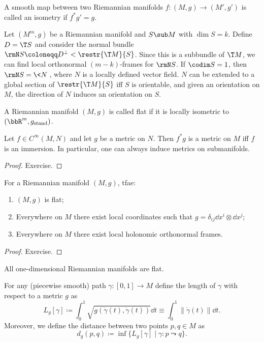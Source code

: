 \begin{defn}[Isometry]
A smooth map between two Riemannian manifolds $f:(M,g)\to(M',g')$ is called an isometry if $f^\ast g'=g$.
\end{defn}

\begin{cor}
Let $(M^m,g)$ be a Riemannian manifold and $S\sub M$ with $\dim S=k$. Define $D=\T S$ and consider the normal bundle $\rmN S\coloneqq D^\perp<\restr{\T M}{S}$. Since this is a subbundle of $\T M$, we can find local orthonormal $(m-k)$-frames for $\rmN S$. If $\codim S=1$, then $\rmN S=\<N\>$, where $N$ is a locally defined vector field. $N$ can be extended to a global section of $\restr{\T M}{S}$ iff $S$ is orientable, and given an orientation on $M$, the direction of $N$ induces an orientation on $S$.
\end{cor}


\begin{defn}
A Riemannian manifold $(M,g)$ is called flat if it is locally isometric to $(\bbR^m,g_{\text{stand}})$.
\end{defn}


\begin{thm}
Let $f\in C^\infty(M,N)$ and let $g$ be a metric on $N$. Then $f^\ast g$ is a metric on $M$ iff $f$ is an immersion. In particular, one can always induce metrics on submanifolds.
\end{thm}
\begin{proof}
Exercise.
\end{proof}

\begin{thm}
For a Riemannian manifold $(M,g)$,  \gls{tfae}:
\begin{enumerate}
    \item $(M,g)$ is flat;
    \item Everywhere on $M$ there exist local coordinates such that $g=\delta_{ij} \dd x^i\otimes \dd x^j$;
    \item Everywhere on $M$ there exist local holonomic orthonormal frames.
\end{enumerate}
\end{thm}
\begin{proof}
Exercise.
\end{proof}
\begin{cor}
All one-dimensional Riemannian manifolds are flat.
\end{cor}


\begin{defn}
    For any (piecewise smooth) path $\gamma:[0,1]\to M$ define the length of $\gamma$ with respect to a metric $g$ as
    \[L_g[\gamma]\coloneqq \int_0^1 \sqrt{g(\dot\gamma(t),\dot\gamma(t))}\dd t \equiv \int_0^1 \lVert\dot\gamma(t)\rVert \dd t.\]
    Moreover, we define the distance between two points $p,q\in M$ as 
    \[d_g(p,q)\coloneqq \inf \{L_g[\gamma]\mid \gamma:p\leadsto q\}.\]
\end{defn}

